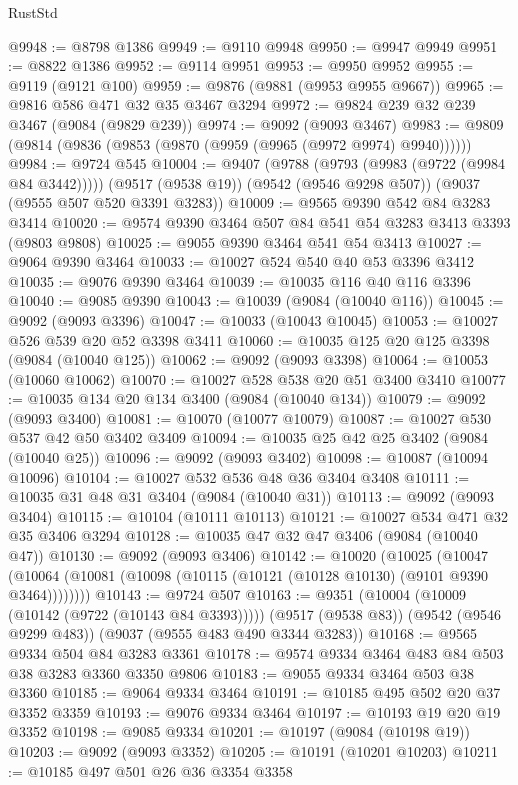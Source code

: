 \begin{lexlean}{RustStd}
\begin{coremodule}
@9948 := @8798 @1386
@9949 := @9110 @9948
@9950 := @9947 @9949
@9951 := @8822 @1386
@9952 := @9114 @9951
@9953 := @9950 @9952
@9955 := @9119 (@9121 @100)
@9959 := @9876 (@9881 (@9953 @9955 @9667))
@9965 := @9816 @586 @471 @32 @35 @3467 @3294
@9972 := @9824 @239 @32 @239 @3467 (@9084 (@9829 @239))
@9974 := @9092 (@9093 @3467)
@9983 := @9809 (@9814 (@9836 (@9853 (@9870 (@9959 (@9965 (@9972 @9974) @9940))))))
@9984 := @9724 @545
@10004 := @9407
    (@9788 (@9793 (@9983 (@9722 (@9984 @84 @3442)))))
    (@9517 (@9538 @19))
    (@9542 (@9546 @9298 @507))
    (@9037 (@9555 @507 @520 @3391 @3283))
@10009 := @9565 @9390 @542 @84 @3283 @3414
@10020 := @9574 @9390 @3464 @507 @84 @541 @54 @3283 @3413 @3393 (@9803 @9808)
@10025 := @9055 @9390 @3464 @541 @54 @3413
@10027 := @9064 @9390 @3464
@10033 := @10027 @524 @540 @40 @53 @3396 @3412
@10035 := @9076 @9390 @3464
@10039 := @10035 @116 @40 @116 @3396
@10040 := @9085 @9390
@10043 := @10039 (@9084 (@10040 @116))
@10045 := @9092 (@9093 @3396)
@10047 := @10033 (@10043 @10045)
@10053 := @10027 @526 @539 @20 @52 @3398 @3411
@10060 := @10035 @125 @20 @125 @3398 (@9084 (@10040 @125))
@10062 := @9092 (@9093 @3398)
@10064 := @10053 (@10060 @10062)
@10070 := @10027 @528 @538 @20 @51 @3400 @3410
@10077 := @10035 @134 @20 @134 @3400 (@9084 (@10040 @134))
@10079 := @9092 (@9093 @3400)
@10081 := @10070 (@10077 @10079)
@10087 := @10027 @530 @537 @42 @50 @3402 @3409
@10094 := @10035 @25 @42 @25 @3402 (@9084 (@10040 @25))
@10096 := @9092 (@9093 @3402)
@10098 := @10087 (@10094 @10096)
@10104 := @10027 @532 @536 @48 @36 @3404 @3408
@10111 := @10035 @31 @48 @31 @3404 (@9084 (@10040 @31))
@10113 := @9092 (@9093 @3404)
@10115 := @10104 (@10111 @10113)
@10121 := @10027 @534 @471 @32 @35 @3406 @3294
@10128 := @10035 @47 @32 @47 @3406 (@9084 (@10040 @47))
@10130 := @9092 (@9093 @3406)
@10142 := @10020
    (@10025
      (@10047 (@10064 (@10081 (@10098 (@10115 (@10121 (@10128 @10130) (@9101 @9390 @3464))))))))
@10143 := @9724 @507
@10163 := @9351
    (@10004 (@10009 (@10142 (@9722 (@10143 @84 @3393)))))
    (@9517 (@9538 @83))
    (@9542 (@9546 @9299 @483))
    (@9037 (@9555 @483 @490 @3344 @3283))
@10168 := @9565 @9334 @504 @84 @3283 @3361
@10178 := @9574 @9334 @3464 @483 @84 @503 @38 @3283 @3360 @3350 @9806
@10183 := @9055 @9334 @3464 @503 @38 @3360
@10185 := @9064 @9334 @3464
@10191 := @10185 @495 @502 @20 @37 @3352 @3359
@10193 := @9076 @9334 @3464
@10197 := @10193 @19 @20 @19 @3352
@10198 := @9085 @9334
@10201 := @10197 (@9084 (@10198 @19))
@10203 := @9092 (@9093 @3352)
@10205 := @10191 (@10201 @10203)
@10211 := @10185 @497 @501 @26 @36 @3354 @3358

\end{coremodule}
\end{lexlean}
